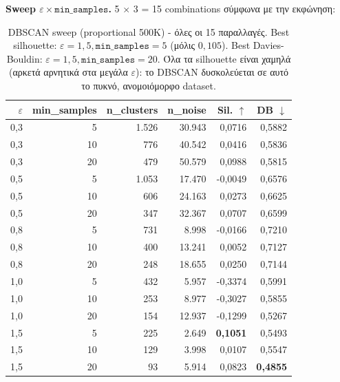 \documentclass[12pt,a4paper,twoside]{book}
\begin{document}
\textbf{Sweep \(\varepsilon \times \texttt{min\_samples}\).} 5
\(\times\) 3 = 15 combinations σύμφωνα με την εκφώνηση:

\begin{table}[H]
    \centering
    \small
    \begin{tabular}{rrrrrr}
        \toprule
        \textbf{\(\varepsilon\)} & \textbf{min\_samples} &
        \textbf{n\_clusters} & \textbf{n\_noise} &
        \textbf{Sil. \(\uparrow\)} & \textbf{DB \(\downarrow\)} \\
        \midrule
        0{,}3 & 5  & 1.526 & 30.943 & 0{,}0716 & 0{,}5882 \\
        0{,}3 & 10 & 776   & 40.542 & 0{,}0416 & 0{,}5836 \\
        0{,}3 & 20 & 479   & 50.579 & 0{,}0988 & 0{,}5815 \\
        0{,}5 & 5  & 1.053 & 17.470 & -0{,}0049 & 0{,}6576 \\
        0{,}5 & 10 & 606   & 24.163 & 0{,}0273 & 0{,}6625 \\
        0{,}5 & 20 & 347   & 32.367 & 0{,}0707 & 0{,}6599 \\
        0{,}8 & 5  & 731   & 8.998  & -0{,}0166 & 0{,}7210 \\
        0{,}8 & 10 & 400   & 13.241 & 0{,}0052 & 0{,}7127 \\
        0{,}8 & 20 & 248   & 18.655 & 0{,}0250 & 0{,}7144 \\
        1{,}0 & 5  & 432   & 5.957  & -0{,}3374 & 0{,}5991 \\
        1{,}0 & 10 & 253   & 8.977  & -0{,}3027 & 0{,}5855 \\
        1{,}0 & 20 & 154   & 12.937 & -0{,}1299 & 0{,}5267 \\
        1{,}5 & 5  & 225   & 2.649  & \textbf{0{,}1051} & 0{,}5493 \\
        1{,}5 & 10 & 129   & 3.998  & 0{,}0107 & 0{,}5547 \\
        1{,}5 & 20 & 93    & 5.914  & 0{,}0823 & \textbf{0{,}4855} \\
        \bottomrule
    \end{tabular}
    \caption{DBSCAN sweep (proportional 500K) - όλες οι 15 παραλλαγές. Best
    silhouette: \(\varepsilon=1{,}5, \texttt{min\_samples}=5\) (μόλις
    \(0{,}105\)). Best Davies-Bouldin: \(\varepsilon=1{,}5,
    \texttt{min\_samples}=20\). Όλα τα silhouette είναι χαμηλά (αρκετά
    αρνητικά στα μεγάλα \(\varepsilon\)): το DBSCAN δυσκολεύεται σε αυτό
    το πυκνό, ανομοιόμορφο dataset.}
    \label{tab:q3_dbscan}
\end{table}
\end{document}
